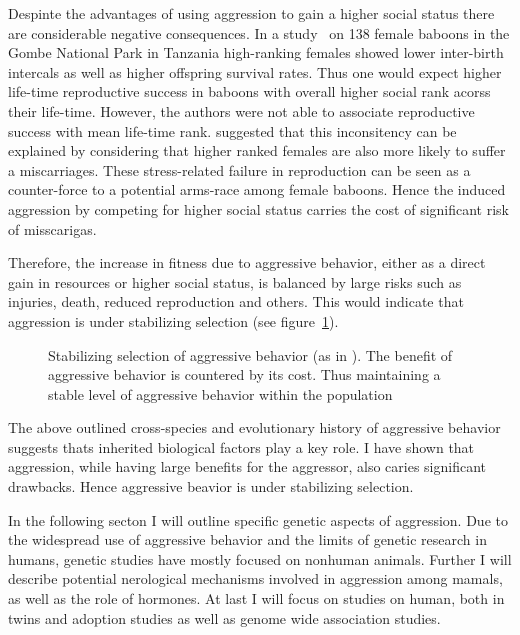Despinte the advantages of using aggression to gain a higher social status there are considerable negative consequences.
In a study~\cite{Packer1995} on 138 female baboons in the Gombe National Park in Tanzania high-ranking females showed lower inter-birth intercals as well as higher offspring survival rates.
Thus one would expect higher life-time reproductive success in baboons with overall higher social rank acorss their life-time.
However, the authors were not able to associate reproductive success with mean life-time rank.
\citet{Packer1995} suggested that this inconsitency can be explained by considering that higher ranked females are also more likely to suffer a  miscarriages.
These stress-related failure in reproduction can be seen as a counter-force to a potential arms-race among female baboons.
Hence the induced aggression by competing for higher social status carries the cost of significant risk of misscarigas.

Therefore, the increase in fitness due to aggressive behavior, either as a direct gain in resources or higher social status, is balanced by large risks such as injuries, death, reduced reproduction and others.
This would indicate that aggression is under stabilizing selection (see figure~\ref{fig:stab}).

\begin{figure}[hp]
	\centering
	\scalebox{0.6}{}
  \caption{Stabilizing selection of aggressive behavior (as in \citet{Anholt2012}). The benefit of aggressive behavior is countered by its cost. Thus maintaining a stable level of aggressive behavior within the population}
	\label{fig:stab}
\end{figure}

The above outlined cross-species and evolutionary history of aggressive behavior suggests thats inherited biological factors play a key role.
I have shown that aggression, while having large benefits for the aggressor, also caries significant drawbacks.
Hence aggressive beavior is under stabilizing selection.

In the following secton I will outline specific genetic aspects of aggression.
Due to the widespread use of aggressive behavior and the limits of genetic research in humans, genetic studies have mostly focused on nonhuman animals.
Further I will describe potential nerological mechanisms involved in aggression among mamals, as well as the role of hormones.
At last I will focus on studies on human, both in twins and adoption studies as well as genome wide association studies.


